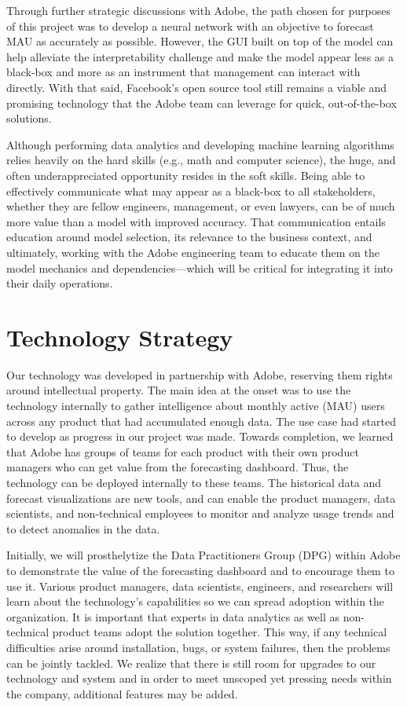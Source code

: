 \documentclass[11pt, oneside, authoryear]{report}
\begin{document}
Through further strategic discussions with Adobe, the path chosen for purposes of this project was to develop a neural network with an objective to forecast MAU as accurately as possible. However, the GUI built on top of the model can help alleviate the interpretability challenge and make the model appear less as a black-box and more as an instrument that management can interact with directly. With that said, Facebook's open source tool still remains a viable and promising technology that the Adobe team can leverage for quick, out-of-the-box solutions.

Although performing data analytics and developing machine learning algorithms relies heavily on the hard skills (e.g., math and computer science), the huge, and often underappreciated opportunity resides in the soft skills. Being able to effectively communicate what may appear as a black-box to all stakeholders, whether they are fellow engineers, management, or even lawyers, can be of much more value than a model with improved accuracy. That communication entails education around model selection, its relevance to the business context, and ultimately, working with the Adobe engineering team to educate them on the model mechanics and dependencies---which will be critical for integrating it into their daily operations.

\section{Technology Strategy}
Our technology was developed in partnership with Adobe, reserving them rights around intellectual property. The main idea at the onset was to use the technology internally to gather intelligence about monthly active (MAU) users across any product that had accumulated enough data. The use case had started to develop as progress in our project was made. Towards completion, we learned that Adobe has groups of teams for each product with their own product managers who can get value from the forecasting dashboard. Thus, the technology can be deployed internally to these teams. The historical data and forecast visualizations are new tools, and can enable the product managers, data scientists, and non-technical employees to monitor and analyze usage trends and to detect anomalies in the data.

Initially, we will prosthelytize the Data Practitioners Group (DPG) within Adobe to demonstrate the value of the forecasting dashboard and to encourage them to use it. Various product managers, data scientists, engineers, and researchers will learn about the technology's capabilities so we can spread adoption within the organization. It is important that experts in data analytics as well as non-technical product teams adopt the solution together. This way, if any technical difficulties arise around installation, bugs, or system failures, then the problems can be jointly tackled. We realize that there is still room for upgrades to our technology and system and in order to meet unscoped yet pressing needs within the company, additional features may be added.
\end{document}
